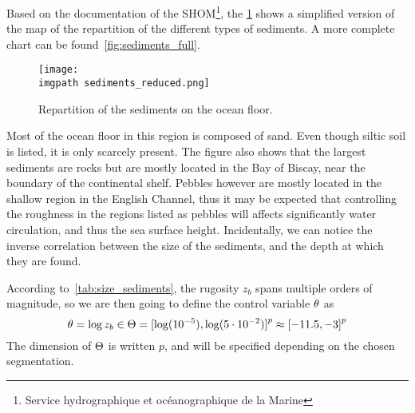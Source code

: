 \documentclass[../../Main_ManuscritThese.tex]{subfiles}
\newcommand{\zob}{z_b}
\newcommand\imgpath{/home/victor/acadwriting/Manuscrit/Text/Chapter5/img/}
\begin{document}
Based on the documentation of the SHOM\footnote{Service hydrographique
  et océanographique de la Marine}, the \cref{fig:sediments_reduced}
shows a simplified version of the map of the repartition of the
different types of sediments. A more complete chart can be
found~\cref{fig:sediments_full}.
\begin{figure}[ht]
  \centering
  \texttt{[image: \\imgpath sediments\_reduced.png]}
  \caption{\label{fig:sediments_reduced} Repartition of the sediments
    on the ocean floor.}
\end{figure}

Most of the ocean floor in this region is composed of sand. Even
though siltic soil is listed, it is only scarcely present. The figure
also shows that the largest sediments are rocks but are mostly located
in the Bay of Biscay, near the boundary of the continental
shelf. Pebbles however are mostly located in the shallow region in the
English Channel, thus it may be expected that controlling the
roughness in the regions listed as pebbles will affects significantly
water circulation, and thus the sea surface height. Incidentally, we
can notice the inverse correlation between the size of the sediments,
and the depth at which they are found.

According to~\cref{tab:size_sediments}, the rugosity $\zob$ spans
multiple orders of magnitude, so we are then going to define the control
variable $\theta$ as
\begin{equation}
  \kk = \log \zob \in \Kspace = \interval{\log(10^{-5})}{\log (5\cdot 10^{-2})}^p \approx \interval{-11.5}{-3}^p
\end{equation}
The dimension of $\Theta$ is written $p$, and will be specified
depending on the chosen segmentation.
\end{document}
